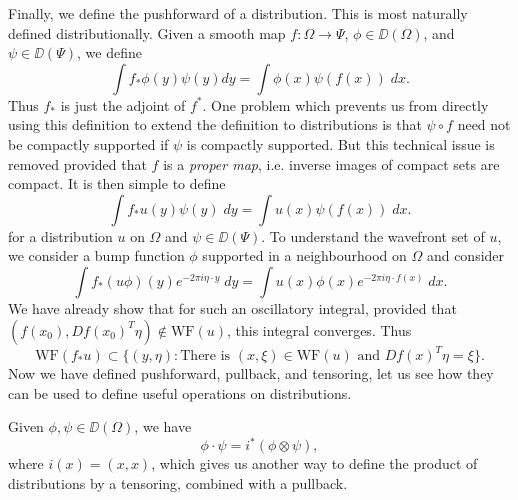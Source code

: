 Finally, we define the pushforward of a distribution. This is most naturally defined distributionally. Given a smooth map $f: \Omega \to \Psi$, $\phi \in \DD(\Omega)$, and $\psi \in \DD(\Psi)$, we define
%
\[ \int f_* \phi(y) \psi(y) dy = \int \phi(x) \psi(f(x))\; dx. \]
%
Thus $f_*$ is just the adjoint of $f^*$. One problem which prevents us from directly using this definition to extend the definition to distributions is that $\psi \circ f$ need not be compactly supported if $\psi$ is compactly supported. But this technical issue is removed provided that $f$ is a \emph{proper map}, i.e. inverse images of compact sets are compact. It is then simple to define
%
\[ \int f_* u(y) \psi(y)\; dy = \int u(x) \psi(f(x))\; dx. \]
%
for a distribution $u$ on $\Omega$ and $\psi \in \DD(\Psi)$. To understand the wavefront set of $u$, we consider a bump function $\phi$ supported in a neighbourhood  on $\Omega$ and consider
%
\[ \int f_*(u \phi)(y) e^{-2 \pi i \eta \cdot y}\; dy = \int u(x) \phi(x) e^{-2 \pi i \eta \cdot f(x)}\; dx. \]
%
We have already show that for such an oscillatory integral, provided that $(f(x_0),Df(x_0)^T \eta) \not \in \text{WF}(u)$, this integral converges. Thus
%
\[ \text{WF}(f_* u) \subset \{ (y,\eta) : \text{There is $(x,\xi) \in \text{WF}(u)$ and $Df(x)^T \eta = \xi$} \}. \]
%
Now we have defined pushforward, pullback, and tensoring, let us see how they can be used to define useful operations on distributions.

\begin{example}
    Given $\phi,\psi \in \DD(\Omega)$, we have
    \[ \phi \cdot \psi = i^*(\phi \otimes \psi), \]
    where $i(x) = (x,x)$, which gives us another way to define the product of distributions by a tensoring, combined with a pullback.
\end{example}

